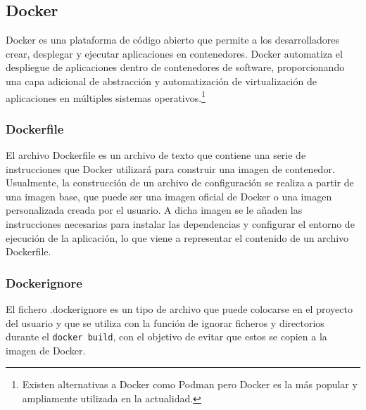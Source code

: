 \documentclass[12pt, a4paper, twoside]{article}
\begin{document}
\subsection{Docker}
\label{sec:Docker}
Docker \cite{docker} es una plataforma de código abierto que permite a los desarrolladores crear, desplegar y ejecutar aplicaciones en contenedores. Docker automatiza el despliegue de aplicaciones dentro de contenedores de software, proporcionando una capa adicional de abstracción y automatización de virtualización de aplicaciones en múltiples sistemas operativos.\footnote{Existen alternativas a Docker como Podman \cite{podman} pero Docker es la más popular y ampliamente utilizada en la actualidad.}
\subsubsection{Dockerfile}
\label{sec:Dockerfile}
El archivo Dockerfile \cite{dockerfile_concepts} es un archivo de texto que contiene una serie de instrucciones que Docker utilizará para construir una imagen de contenedor.
Usualmente, la construcción de un archivo de configuración se realiza a partir de una imagen base, que puede ser una imagen oficial de Docker o una imagen personalizada creada por el usuario.
A dicha imagen se le añaden las instrucciones necesarias para instalar las dependencias y configurar el entorno de ejecución de la aplicación, lo que viene a representar el contenido de un archivo Dockerfile.
\subsubsection{Dockerignore}
\label{sec:dockerignore}
El fichero .dockerignore \cite{dockerignore} es un tipo de archivo que puede colocarse en el proyecto del usuario y que se utiliza con la función de ignorar ficheros y directorios durante el \texttt{docker build}, con el objetivo de evitar que estos se copien a la imagen de Docker.
\newpage
\end{document}
